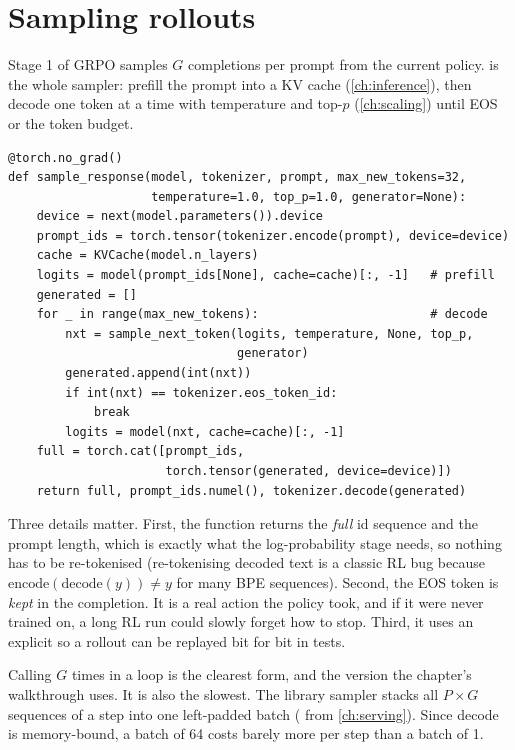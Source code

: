 \section{Sampling rollouts}\label{sec:grpo:rollouts}

Stage 1 of GRPO samples $G$ completions per prompt from the current policy.
 is the whole sampler: prefill the prompt into a KV cache
(\cref{ch:inference}), then decode one token at a time with temperature and top-$p$
(\cref{ch:scaling}) until EOS or the token budget.

\begin{lstlisting}[caption={Unbatched rollout sampler (\texttt{labs/lab17\_grpo/solution.py}).},label={lst:grpo:sample}]
@torch.no_grad()
def sample_response(model, tokenizer, prompt, max_new_tokens=32,
                    temperature=1.0, top_p=1.0, generator=None):
    device = next(model.parameters()).device
    prompt_ids = torch.tensor(tokenizer.encode(prompt), device=device)
    cache = KVCache(model.n_layers)
    logits = model(prompt_ids[None], cache=cache)[:, -1]   # prefill
    generated = []
    for _ in range(max_new_tokens):                        # decode
        nxt = sample_next_token(logits, temperature, None, top_p,
                                generator)
        generated.append(int(nxt))
        if int(nxt) == tokenizer.eos_token_id:
            break
        logits = model(nxt, cache=cache)[:, -1]
    full = torch.cat([prompt_ids,
                      torch.tensor(generated, device=device)])
    return full, prompt_ids.numel(), tokenizer.decode(generated)
\end{lstlisting}

Three details matter. First, the function returns the \emph{full} id sequence and the
prompt length, which is exactly what the log-probability stage needs, so nothing has to be
re-tokenised (re-tokenising decoded text is a classic RL bug because
$\text{encode}(\text{decode}(y))\neq y$ for many BPE sequences). Second, the EOS token is
\emph{kept} in the completion. It is a real action the policy took, and if it were never
trained on, a long RL run could slowly forget how to stop. Third, it uses an explicit
 so a rollout can be replayed bit for bit in tests.

Calling  $G$ times in a loop is the clearest form, and the version the
chapter's walkthrough uses. It is also the slowest. The library sampler
 stacks all $P\times G$ sequences of a step into one
left-padded batch ( from \cref{ch:serving}). Since decode is
memory-bound, a batch of 64 costs barely more per step than a batch of 1.

